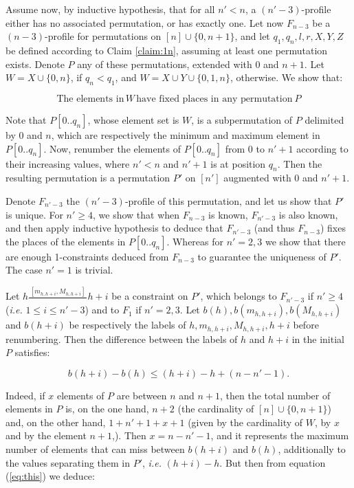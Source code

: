 \documentclass{article}
\newcommand{\n}{[n]}
\begin{document}
Assume now, by inductive hypothesis, that for all $n'< n$,  a $(n'-3)$-profile either has no
associated permutation, or has exactly one. Let now $F_{n-3}$ be a $(n-3)$-profile for permutations on 
$\n\cup\{0,n+1\}$,  and let $q_1, q_n, l,r, X, Y, Z$ be defined according to  Claim \ref{claim:1n}, assuming at least one
permutation exists. Denote $P$ any of these permutations, extended with $0$ and $n+1$. 
Let $W=X\cup\{0,n\}$, if $q_n<q_1$,  and $W=X\cup Y\cup \{0, 1, n\}$, otherwise. We show
that:


\begin{equation}
\mbox{The elements in}\, W\, \mbox{have fixed places in any permutation}\ P 
\label{eq:three}
\end{equation}

Note that $P[0..q_n]$, whose element set is $W$,  is a subpermutation of $P$ delimited by $0$ and $n$,  
which are respectively the  
minimum and maximum element in $P[0..q_n]$. Now, renumber the elements of  $P[0..q_n]$ from $0$ 
to $n'+1$ according to their increasing values, where $n'<n$ and $n'+1$ is at position $q_n$. 
Then the resulting permutation is a permutation $P'$ on $[n']$ augmented with $0$ and $n'+1$.

Denote  $F_{n'-3}$ the $(n'-3)$-profile of this permutation, and let us show  that $P'$ is unique.
For $n'\geq 4$, we show that when $F_{n-3}$ is known, 
$F_{n'-3}$ is also known, and then apply inductive hypothesis  to deduce that $F_{n'-3}$ (and thus $F_{n-3}$) fixes 
the places of the elements in $P[0..q_n]$.   Whereas for $n'=2, 3$ 
we show that there are enough 1-constraints deduced from   $F_{n-3}$ to guarantee the uniqueness of $P'$.
The case $n'=1$ is trivial.

Let $h\frac{\,\scriptstyle{[m_{h,h+i},M_{h,h+i}]}\,}{}h+i$ be a constraint on $P'$, which belongs to $F_{n'-3}$ if $n'\geq 4$
({\em i.e.} $1\leq i\leq n'-3$) and to $F_1$ if $n'=2,3$.   Let $b(h), b(m_{h,h+i}), b(M_{h,h+i})$ and $b(h+i)$ 
be respectively the labels of $h, m_{h,h+i},M_{h,h+i}, h+i$ before renumbering. Then the difference between the labels
of $h$ and $h+i$ in the initial $P$ satisfies:

\begin{equation}
b(h+i)-b(h)\leq (h+i)-h+(n-n'-1).
\label{eq:this}
\end{equation}

\noindent Indeed, if $x$ elements of $P$ are between $n$ and $n+1$, then the total number of elements in $P$
is, on the one hand, $n+2$ (the cardinality of $\n\cup\{0,n+1\}$) and, on the other hand, $1+n'+1+x+1$
(given by  the cardinality of $W$, by $x$ and by the element $n+1$,). Then $x=n-n'-1$, and it represents
the maximum number of elements that can miss between $b(h+i)$ and $b(h)$, additionally to the values
separating them in $P'$, {\em i.e.} $(h+i)-h$. But then from equation (\ref{eq:this}) we deduce: 
\end{document}
